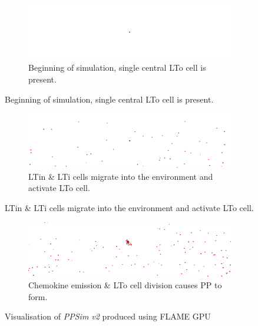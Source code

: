 \documentclass{UoYCSproject}
\begin{document}
\begin{figure}[htp]
\begin{subfigure}{\textwidth}
\centering
\includegraphics[width=\textwidth]{Appendix/Sim/Start}
\caption{Beginning of simulation, single central \gls{LTo} cell is present.}
\label{fig:sim_start}
\end{subfigure}
\end{figure}

\begin{figure}[htp]\ContinuedFloat
\begin{subfigure}{\textwidth}
\centering
\includegraphics[width=\textwidth]{Appendix/Sim/Migration}
\caption{\gls{LTin} \& \gls{LTi} cells migrate into the environment and activate \gls{LTo} cell.}
\label{fig:sim_contact}
\end{subfigure}
\end{figure}

\begin{figure}[htp]\ContinuedFloat
\begin{subfigure}{\textwidth}
\centering
\includegraphics[width=\textwidth]{Appendix/Sim/Patch}
\caption{Chemokine emission \& \gls{LTo} cell division causes \gls{PP} to form.}
\label{fig:sim_patch}
\end{subfigure}


\caption{Visualisation of \textit{PPSim v2} produced using \gls{FLAME GPU}}
\label{fig:ppsimv2_vis}
\end{figure}
\end{document}
